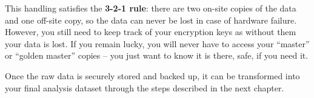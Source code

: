 \noindent This handling satisfies the \textbf{3-2-1 rule}:
there are two on-site copies of the data and one off-site copy,
so the data can never be lost in case of hardware failure.
However, you still need to keep track of your encryption keys as without them your data is lost.
If you remain lucky, you will never have to access your ``master'' or ``golden master'' copies --
you just want to know it is there, safe, if you need it.

Once the raw data is securely stored and backed up, 
it can be transformed into your final analysis dataset
through the steps described in the next chapter.
